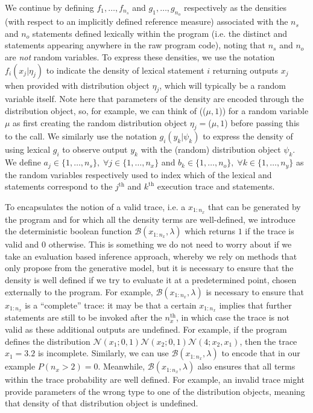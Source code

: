 We continue by defining $f_{1},\dots,f_{n_s}$ and $g_{1},\dots,g_{n_o}$ respectively as the densities (with respect to
an implicitly defined reference measure) associated with the $n_s$ \sample 
and $n_o$ \observe statements defined lexically within the program (i.e. the distinct \sample and \observe
statements appearing anywhere in the raw program code), noting that $n_s$ and $n_o$ are \emph{not} random variables.
To express these densities, we use the notation $f_i(x_j|\eta_j)$ 
to indicate the density of lexical \sample statement $i$ returning outputs $x_j$ when provided
with distribution object $\eta_j$, which will typically be a random variable itself.  Note here that parameters
of the density are encoded through the distribution object, so, for example, we can think of
\sample(\normal($\mu,1$)) for a random variable $\mu$ as first creating the random distribution object
$\eta_j=$\normal($\mu,1$) before passing this to the \sample call.
We similarly use the notation $g_i(y_k|\psi_k)$ to express the density of
using lexical \observe $g_i$ to observe output $y_k$ with the (random) distribution object $\psi_k$.
We define $a_j \in \{1,\dots,n_s\}, \; 
\forall j\in\{1,\dots,n_x\}$ and $b_k \in \{1,\dots,n_o\}, \; \forall k\in\{1,\dots,n_y\}$ as the
random variables respectively used to index which of the lexical \sample and \observe statements
correspond to the $j^{\text{th}}$ and $k^{\text{th}}$ execution trace \sample and \observe statements.

To encapsulates the notion of a valid trace, i.e. a $x_{1:n_{x}}$ that can be generated by the program and
for which all the density terms are well-defined,
we introduce the deterministic boolean function $\mathcal{B}(x_{1:n_x},\lambda)$
which returns $1$ if the trace is valid and $0$ otherwise.   This is something we do not need
to worry about if we take an evaluation based inference approach, whereby
we rely on methods that only propose from the generative model, but it is necessary to ensure that the density
is well defined if we try to evaluate it at a predetermined point, chosen externally to the program.
For example, $\mathcal{B}(x_{1:n_x},\lambda)$ is necessary to
ensure that $x_{1:n_x}$ is a ``complete'' trace: it may be that a certain $x_{1:n_x}$
implies that further \sample statements are still to be invoked after the $n_x^{\text{th}}$, in which case the
trace is not valid as these additional outputs are undefined.  For example, if the program defines the distribution
$\mathcal{N}(x_1;0,1)\mathcal{N}(x_2;0,1)\mathcal{N}(4;x_2,x_1)$, then the trace $x_1=3.2$ is incomplete.
Similarly, we can use  $\mathcal{B}(x_{1:n_x},\lambda)$ to encode that in our example $P(n_x>2)=0$.  Meanwhile,
$\mathcal{B}(x_{1:n_x},\lambda)$ also ensures that  all terms within the
trace probability are well defined.  For example, an invalid trace might provide parameters of the wrong type
to one of the distribution objects, meaning that density of that distribution object is undefined.

